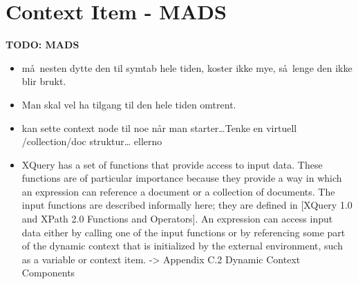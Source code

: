 \section{Context Item - {MADS}}
\label{sect:disc:ctxItem}
\textbf{\LARGE TODO: {MADS}}
\begin{itemize}
  \item m\aa~nesten dytte den til symtab hele tiden, koster ikke mye, s\aa~lenge den ikke blir brukt.
  \item Man skal vel ha tilgang til den hele tiden omtrent.
  \item kan sette context node til noe n\aa r man starter\ldots Tenke en virtuell /collection/doc struktur\ldots
  ellerno
  \item XQuery has a set of functions that provide access to input data. These functions are of particular
  importance because they provide a way in which an expression can reference a document or a collection of
  documents. The input functions are described informally here; they are defined in [XQuery 1.0 and XPath 2.0
  Functions and Operators]. An expression can access input data either by calling one of the input functions or by
  referencing some part of the dynamic context that is initialized by the external environment, such as a variable
  or context item. -> Appendix C.2 Dynamic Context Components
\end{itemize}